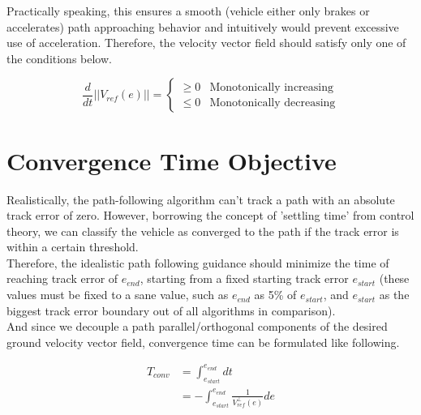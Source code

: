 Practically speaking, this ensures a smooth (vehicle either only brakes or accelerates) path approaching behavior and intuitively would prevent excessive use of acceleration. Therefore, the velocity vector field should satisfy only one of the conditions below.

\begin{equation}
    \frac{d}{dt}||V_{ref}(e)||=\begin{cases}
    \geq 0& \text{Monotonically increasing}\\
    \leq 0& \text{Monotonically decreasing}
\end{cases}
\end{equation}

\section{Convergence Time Objective}
Realistically, the path-following algorithm can't track a path with an absolute track error of zero. However, borrowing the concept of 'settling time' from control theory, we can classify the vehicle as converged to the path if the track error is within a certain threshold.\\

Therefore, the idealistic path following guidance should minimize the time of reaching track error of $e_{end}$, starting from a fixed starting track error $e_{start}$ (these values must be fixed to a sane value, such as $e_{end}$ as 5\% of $e_{start}$, and $e_{start}$ as the biggest track error boundary out of all algorithms in comparison).\\

And since we decouple a path parallel/orthogonal components of the desired ground velocity vector field, convergence time can be formulated like following.

\begin{equation}
\begin{split}
T_{conv} &= \int^{e_{end}}_{e_{start}}dt\\
&= -\int^{e_{end}}_{e_{start}}\frac{1}{V_{ref}^{\perp}(e)}de
\end{split}
\label{eq:convergence_time_definition}
\end{equation}